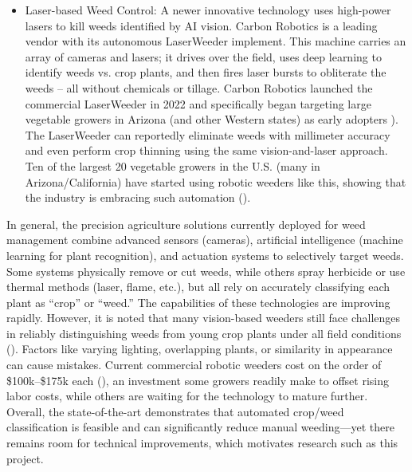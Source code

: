 \documentclass[letterpaper]{report}
\begin{document}
\begin{itemize}
	\item{Laser-based Weed Control: A newer innovative technology uses high-power lasers to kill weeds identified by AI vision. Carbon Robotics is a leading vendor with its autonomous LaserWeeder implement. This machine carries an array of cameras and lasers; it drives over the field, uses deep learning to identify weeds vs. crop plants, and then fires laser bursts to obliterate the weeds – all without chemicals or tillage. Carbon Robotics launched the commercial LaserWeeder in 2022 and specifically began targeting large vegetable growers in Arizona (and other Western states) as early adopters \cite{It2023-fx}). The LaserWeeder can reportedly eliminate weeds with millimeter accuracy and even perform crop thinning using the same vision-and-laser approach. Ten of the largest 20 vegetable growers in the U.S. (many in Arizona/California) have started using robotic weeders like this, showing that the industry is embracing such automation (\cite{Belton2021-mv}).}

\end{itemize}

In general, the precision agriculture solutions currently deployed for weed management combine advanced sensors (cameras), artificial intelligence (machine learning for plant recognition), and actuation systems to selectively target weeds. Some systems physically remove or cut weeds, while others spray herbicide or use thermal methods (laser, flame, etc.), but all rely on accurately classifying each plant as “crop” or “weed.” The capabilities of these technologies are improving rapidly. However, it is noted that many vision-based weeders still face challenges in reliably distinguishing weeds from young crop plants under all field conditions (\cite{American-Society-of-Agronomy2018-ad}). Factors like varying lighting, overlapping plants, or similarity in appearance can cause mistakes. Current commercial robotic weeders cost on the order of \$100k–\$175k each (\cite{American-Society-of-Agronomy2018-ad}), an investment some growers readily make to offset rising labor costs, while others are waiting for the technology to mature further. Overall, the state-of-the-art demonstrates that automated crop/weed classification is feasible and can significantly reduce manual weeding—yet there remains room for technical improvements, which motivates research such as this project.
\end{document}
